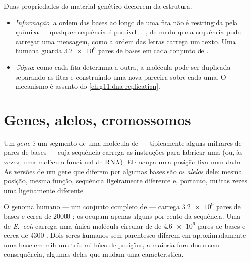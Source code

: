 \begin{proposition}\label{prop:g10:universal-dna:explains}
Duas propriedades do material genético decorrem da estrutura.
\begin{itemize}
  \item \emph{Informação}: a ordem das bases ao longo de uma fita não é
        restringida pela química --- qualquer sequência é possível ---,
        de modo que a sequência pode carregar uma mensagem, como a
        ordem das letras carrega um texto. Uma  humana guarda
        $\num{3.2e9}$ pares de bases em cada conjunto de .
  \item \emph{Cópia}: como cada fita determina a outra, a molécula pode
        ser duplicada separando as fitas e construindo uma nova
        parceira sobre cada uma. O mecanismo é assunto do
        \cref{ch:g11:dna-replication}.
\end{itemize}
\end{proposition}
\admitted

\section{Genes, alelos, cromossomos}

\begin{definition}\label{def:g10:universal-dna:gene}
Um \emph{gene} é um segmento de uma molécula de  ---
tipicamente alguns milhares de pares de bases --- cuja sequência
carrega as instruções para fabricar uma  (ou, às vezes, uma
molécula funcional de RNA). Ele ocupa uma posição fixa num dado
. As versões de um gene que diferem por algumas bases são os
\emph{alelos} dele: mesma posição, mesma função, sequência
ligeiramente diferente e, portanto, muitas vezes uma 
ligeiramente diferente.
\end{definition}

\begin{example}[Números]\label{ex:g10:universal-dna:numbers}
O genoma humano --- um conjunto completo de  --- carrega
$\num{3.2e9}$ pares de bases e cerca de $\num{20000}$ ; os 
ocupam apenas alguns por cento da sequência. Uma  de
\emph{E.~coli} carrega uma única molécula circular de  de
$\num{4.6e6}$ pares de bases e cerca de 4300 . Dois seres humanos
sem parentesco diferem em aproximadamente uma base em mil: uns três
milhões de posições, a maioria fora dos  e sem consequência,
algumas delas  que mudam uma característica.
\end{example}

